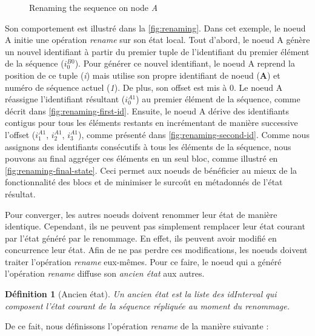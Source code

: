 \documentclass[12pt]{thesul}
\newtheorem{definition}{Définition}
\newcommand{\trm}[1]{\mathit{#1}}
\newcommand{\id}[3]{$\trm{#1}^{\trm{#2}}_{\trm{#3}}$}
\begin{document}
\begin{figure}[t!]
{\begin{minipage}{\linewidth}
          \label{fig:renaming-final-state}
      \end{minipage}}
  \caption{Renaming the sequence on node \emph{A}}
  \label{fig:renaming}
\end{figure}

Son comportement est illustré dans la \autoref{fig:renaming}.
Dans cet exemple, le noeud A initie une opération \emph{rename} sur son état local.
Tout d'abord, le noeud A génère un nouvel identifiant à partir du premier tuple de l'identifiant du premier élément de la séquence (\id{i}{B0}{0}).
Pour générer ce nouvel identifiant, le noeud A reprend la position de ce tuple (\emph{i}) mais utilise son propre identifiant de noeud (\textbf{A}) et numéro de séquence actuel (\emph{1}).
De plus, son offset est mis à 0.
Le noeud A réassigne l'identifiant résultant (\id{i}{A1}{0}) au premier élément de la séquence, comme décrit dans \autoref{fig:renaming-first-id}.
Ensuite, le noeud A dérive des identifiants contigus pour tous les éléments restants en incrémentant de manière successive l'offset (\id{i}{A1}{1}, \id{i}{A1}{2}, \id{i}{A1}{3}), comme présenté dans \autoref{fig:renaming-second-id}.
Comme nous assignons des identifiants consécutifs à tous les éléments de la séquence, nous pouvons au final aggréger ces éléments en un seul bloc, comme illustré en \autoref{fig:renaming-final-state}.
Ceci permet aux noeuds de bénéficier au mieux de la fonctionnalité des blocs et de minimiser le surcoût en métadonnés de l'état résultat.

Pour converger, les autres noeuds doivent renommer leur état de manière identique.
Cependant, ils ne peuvent pas simplement remplacer leur état courant par l'état généré par le renommage.
En effet, ils peuvent avoir modifié en concurrence leur état.
Afin de ne pas perdre ces modifications, les noeuds doivent traiter l'opération \emph{rename} eux-mêmes.
Pour ce faire, le noeud qui a généré l'opération \emph{rename} diffuse son \emph{ancien état} aux autres.

\begin{definition}[Ancien état]
  Un \emph{ancien état} est la liste des idInterval qui composent l'état courant de la séquence répliquée au moment du renommage.
\end{definition}

De ce fait, nous définissons l'opération \emph{rename} de la manière suivante :
\end{document}
